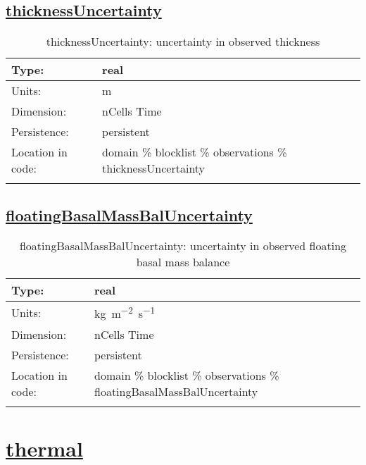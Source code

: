 \subsection[thicknessUncertainty]{\hyperref[sec:var_tab_observations]{thicknessUncertainty}}
\label{subsec:var_sec_observations_thicknessUncertainty}
\begin{center}
\begin{longtable}{| p{2.0in} | p{4.0in} |}
        \hline 
        Type: & real \\
        \hline 
        Units: & \si{m} \\
        \hline 
        Dimension: & nCells Time \\
        \hline 
        Persistence: & persistent \\
        \hline 
         Location in code: & domain \% blocklist \% observations \% thicknessUncertainty \\
         \hline 
    \caption{thicknessUncertainty: uncertainty in observed thickness}
\end{longtable}
\end{center}
\subsection[floatingBasalMassBalUncertainty]{\hyperref[sec:var_tab_observations]{floatingBasalMassBalUncertainty}}
\label{subsec:var_sec_observations_floatingBasalMassBalUncertainty}
\begin{center}
\begin{longtable}{| p{2.0in} | p{4.0in} |}
        \hline 
        Type: & real \\
        \hline 
        Units: & \si{kg.m^{-2}.s^{-1}} \\
        \hline 
        Dimension: & nCells Time \\
        \hline 
        Persistence: & persistent \\
        \hline 
         Location in code: & domain \% blocklist \% observations \% floatingBasalMassBalUncertainty \\
         \hline 
    \caption{floatingBasalMassBalUncertainty: uncertainty in observed floating basal mass balance}
\end{longtable}
\end{center}
\section[thermal]{\hyperref[sec:var_tab_thermal]{thermal}}
\label{sec:var_sec_thermal}
